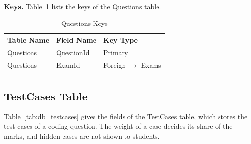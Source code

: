 \par\ifdim\dimexpr\pagegoal-\pagetotal\relax<160pt\newpage\fi
\noindent\textbf{Keys.} Table~\ref{tab:keys_questions} lists the keys of the Questions table.

{\small
\begin{longtable}{>{\raggedright\arraybackslash}p{4.0cm}>{\raggedright\arraybackslash}p{4.6cm}>{\raggedright\arraybackslash}p{4.6cm}}
\caption{Questions Keys}\label{tab:keys_questions}\\
\hline\hline
\textbf{Table Name} & \textbf{Field Name} & \textbf{Key Type} \\ \hline
\endfirsthead
\hline\hline
\endlastfoot
Questions & QuestionId & Primary \\*
Questions & ExamId & Foreign $\rightarrow$ Exams \\*
\end{longtable}
}

\par\ifdim\dimexpr\pagegoal-\pagetotal\relax<376pt\newpage\fi
\subsection{TestCases Table}
Table~\ref{tab:db_testcases} gives the fields of the TestCases table, which stores the test cases of a coding question. The weight of a case decides its share of the marks, and hidden cases are not shown to students.

